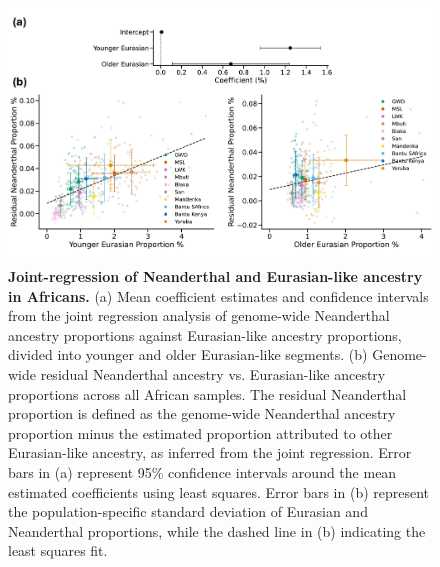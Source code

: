 \begin{figure}
    \centering
    \includegraphics[width=\linewidth]{figures/gb_bta/gb_real_bta_18.pdf}
    \caption{\textbf{Joint-regression of Neanderthal and Eurasian-like ancestry in Africans.} (a) Mean coefficient estimates and confidence intervals from the joint regression analysis of genome-wide Neanderthal ancestry proportions against Eurasian-like ancestry proportions, divided into younger and older Eurasian-like segments. (b) Genome-wide residual Neanderthal ancestry vs. Eurasian-like ancestry proportions across all African samples. The residual Neanderthal proportion is defined as the genome-wide Neanderthal ancestry proportion minus the estimated proportion attributed to other Eurasian-like ancestry, as inferred from the joint regression. Error bars in (a) represent 95\% confidence intervals around the mean estimated coefficients using least squares. Error bars in (b) represent the population-specific standard deviation of Eurasian and Neanderthal proportions, while the dashed line in (b) indicating the least squares fit.}
    \label{fig:gb-bta-nea-supp2}
\end{figure}

